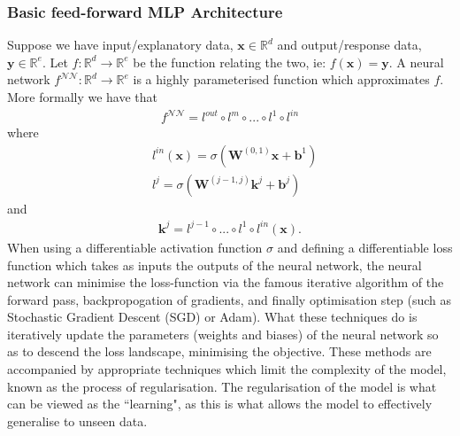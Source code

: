 \documentclass{article}
\theoremstyle{definition}
\begin{document}
\subsubsection{Basic feed-forward MLP Architecture}
Suppose we have input/explanatory data, $\mathbf{x} \in \mathbb{R}^d$ and output/response data, $\mathbf{y} \in \mathbb{R}^e$. Let $f: \mathbb{R}^d \rightarrow \mathbb{R}^e$ be the function relating the two, ie: $f(\mathbf{x})=\mathbf{y}$. A neural network $f^{\mathcal{NN}}: \mathbb{R}^d \rightarrow \mathbb{R}^e$ is a highly parameterised function which approximates $f$. More formally we have that 
\begin{align}
    f^{\mathcal{NN}} = l^{out} \circ l^{m} \circ...\circ l^{1} \circ l^{in}
\end{align}
where
\begin{align}
    &l^{in}(\mathbf{x}) = \sigma \left(\mathbf{W}^{(0,1)}\mathbf{x} + \mathbf{b}^{1}  \right)\\
    &l^{j} = \sigma \left(\mathbf{W}^{(j-1,j)}\mathbf{k}^{j} + \mathbf{b}^{j}  \right) 
 \end{align}
 and
 \begin{align}
     \mathbf{k}^{j} = l^{j-1} \circ...\circ l^{1} \circ l^{in} (\mathbf{x}).
 \end{align}
\noindent
When using a differentiable activation function $\sigma$ and defining a differentiable loss function which takes as inputs the outputs of the neural network, the neural network can minimise the loss-function via the famous iterative algorithm of the forward pass, backpropogation of gradients, and finally optimisation step (such as Stochastic Gradient Descent (SGD) or Adam). What these techniques do is iteratively update the parameters (weights and biases) of the neural network so as to descend the loss landscape, minimising the objective. These methods are accompanied by appropriate techniques which limit the complexity of the model, known as the process of regularisation. The regularisation of the model is what can be viewed as the ``learning", as this is what allows the model to effectively generalise to unseen data.
\end{document}
